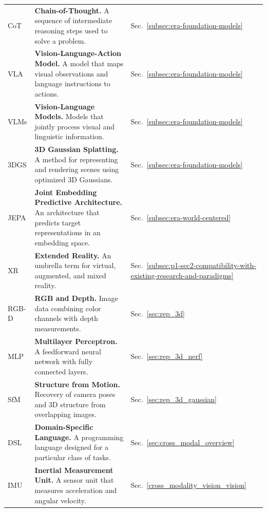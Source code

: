 \begin{longtable}{lll}
    CoT & \textbf{Chain-of-Thought.} A sequence of intermediate reasoning steps used to solve a problem. & Sec.~\ref{subsec:era-foundation-models} \\
    
    VLA & \textbf{Vision-Language-Action Model.} A model that maps visual observations and language instructions to actions. & Sec.~\ref{subsec:era-foundation-models} \\
    
    VLMs & \textbf{Vision-Language Models.} Models that jointly process visual and linguistic information. & Sec.~\ref{subsec:era-foundation-models} \\
    
    3DGS & \textbf{3D Gaussian Splatting.} A method for representing and rendering scenes using optimized 3D Gaussians. & Sec.~\ref{subsec:era-foundation-models} \\
    
    JEPA & \textbf{Joint Embedding Predictive Architecture.} An architecture that predicts target representations in an embedding space. & Sec.~\ref{subsec:era-world-centered} \\
    
    XR & \textbf{Extended Reality.} An umbrella term for virtual, augmented, and mixed reality. & Sec.~\ref{subsec:p1-sec2-compatibility-with-existing-research-and-paradigms} \\
    
    RGB-D & \textbf{RGB and Depth.} Image data combining color channels with depth measurements. & Sec.~\ref{sec:rep_3d} \\
    
    MLP & \textbf{Multilayer Perceptron.} A feedforward neural network with fully connected layers. & Sec.~\ref{sec:rep_3d_nerf} \\
    
    SfM & \textbf{Structure from Motion.} Recovery of camera poses and 3D structure from overlapping images. & Sec.~\ref{sec:rep_3d_gaussian} \\
    
    DSL & \textbf{Domain-Specific Language.} A programming language designed for a particular class of tasks. & Sec.~\ref{sec:cross_modal_overview} \\
    
    IMU & \textbf{Inertial Measurement Unit.} A sensor unit that measures acceleration and angular velocity. & Sec.~\ref{cross_modality_vision_vision} \\
    

\end{longtable}
